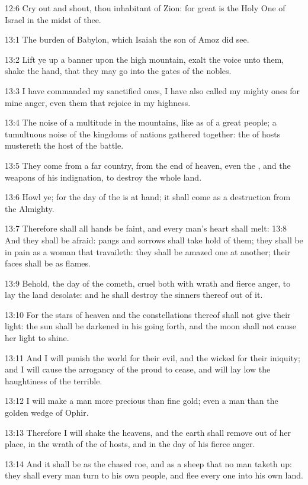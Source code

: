 12:6 Cry out and shout, thou inhabitant of Zion: for great is the Holy One of Israel in the midst of thee.

13:1 The burden of Babylon, which Isaiah the son of Amoz did see.

13:2 Lift ye up a banner upon the high mountain, exalt the voice unto them, shake the hand, that they may go into the gates of the nobles.

13:3 I have commanded my sanctified ones, I have also called my mighty ones for mine anger, even them that rejoice in my highness.

13:4 The noise of a multitude in the mountains, like as of a great people; a tumultuous noise of the kingdoms of nations gathered together: the \LORD of hosts mustereth the host of the battle.

13:5 They come from a far country, from the end of heaven, even the \LORD, and the weapons of his indignation, to destroy the whole land.

13:6 Howl ye; for the day of the \LORD is at hand; it shall come as a destruction from the Almighty.

13:7 Therefore shall all hands be faint, and every man's heart shall melt: 13:8 And they shall be afraid: pangs and sorrows shall take hold of them; they shall be in pain as a woman that travaileth: they shall be amazed one at another; their faces shall be as flames.

13:9 Behold, the day of the \LORD cometh, cruel both with wrath and fierce anger, to lay the land desolate: and he shall destroy the sinners thereof out of it.

13:10 For the stars of heaven and the constellations thereof shall not give their light: the sun shall be darkened in his going forth, and the moon shall not cause her light to shine.

13:11 And I will punish the world for their evil, and the wicked for their iniquity; and I will cause the arrogancy of the proud to cease, and will lay low the haughtiness of the terrible.

13:12 I will make a man more precious than fine gold; even a man than the golden wedge of Ophir.

13:13 Therefore I will shake the heavens, and the earth shall remove out of her place, in the wrath of the \LORD of hosts, and in the day of his fierce anger.

13:14 And it shall be as the chased roe, and as a sheep that no man taketh up: they shall every man turn to his own people, and flee every one into his own land.

